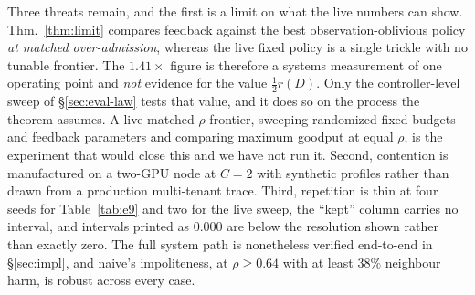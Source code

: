 Three threats remain, and the first is a limit on what the live numbers can show.
Thm.~\ref{thm:limit} compares feedback against the best observation-oblivious
policy \emph{at matched over-admission}, whereas the live fixed policy is a single
trickle with no tunable frontier. The $1.41\times$ figure is therefore a systems
measurement of one operating point and \emph{not} evidence for the value
$\tfrac12 r(D)$. Only the controller-level sweep of \S\ref{sec:eval-law} tests
that value, and it does so on the process the theorem assumes. A live matched-$\rho$
frontier, sweeping randomized fixed budgets and feedback parameters and comparing
maximum goodput at equal $\rho$, is the experiment that would close this and we
have not run it. Second, contention is manufactured on a two-GPU node at $C{=}2$
with synthetic profiles rather than drawn from a production multi-tenant trace.
Third, repetition is thin at four seeds for Table~\ref{tab:e9} and two for the
live sweep, the ``kept'' column carries no interval, and intervals printed as
$0.000$ are below the resolution shown rather than exactly zero. The full system path is nonetheless verified
end-to-end in \S\ref{sec:impl}, and naive's impoliteness, at $\rho\ge0.64$ with at
least $38\%$ neighbour harm, is robust across every case.
